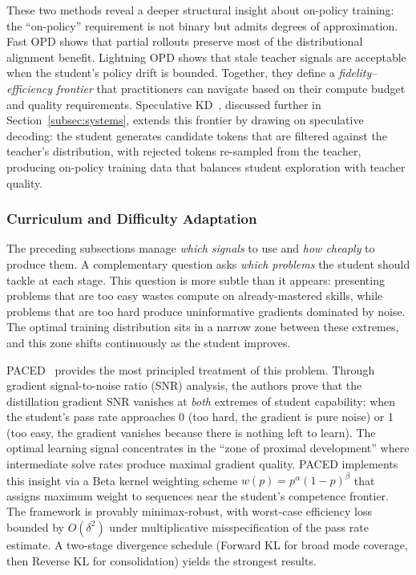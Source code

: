 \documentclass{article} %
\begin{document}
These two methods reveal a deeper structural insight about on-policy training: the ``on-policy'' requirement is not binary but admits degrees of approximation. Fast OPD shows that partial rollouts preserve most of the distributional alignment benefit. Lightning OPD shows that stale teacher signals are acceptable when the student's policy drift is bounded. Together, they define a \emph{fidelity--efficiency frontier} that practitioners can navigate based on their compute budget and quality requirements. Speculative KD~\citep{2410.11325}, discussed further in Section~\ref{subsec:systems}, extends this frontier by drawing on speculative decoding: the student generates candidate tokens that are filtered against the teacher's distribution, with rejected tokens re-sampled from the teacher, producing on-policy training data that balances student exploration with teacher quality.


\subsubsection{Curriculum and Difficulty Adaptation}

The preceding subsections manage \emph{which signals} to use and \emph{how cheaply} to produce them. A complementary question asks \emph{which problems} the student should tackle at each stage. This question is more subtle than it appears: presenting problems that are too easy wastes compute on already-mastered skills, while problems that are too hard produce uninformative gradients dominated by noise. The optimal training distribution sits in a narrow zone between these extremes, and this zone shifts continuously as the student improves.

PACED~\citep{2603.11178} provides the most principled treatment of this problem. Through gradient signal-to-noise ratio (SNR) analysis, the authors prove that the distillation gradient SNR vanishes at \emph{both} extremes of student capability: when the student's pass rate approaches 0 (too hard, the gradient is pure noise) or 1 (too easy, the gradient vanishes because there is nothing left to learn). The optimal learning signal concentrates in the ``zone of proximal development'' where intermediate solve rates produce maximal gradient quality. PACED implements this insight via a Beta kernel weighting scheme $w(p) = p^\alpha(1{-}p)^\beta$ that assigns maximum weight to sequences near the student's competence frontier. The framework is provably minimax-robust, with worst-case efficiency loss bounded by $O(\delta^2)$ under multiplicative misspecification of the pass rate estimate. A two-stage divergence schedule (Forward KL for broad mode coverage, then Reverse KL for consolidation) yields the strongest results.
\end{document}
